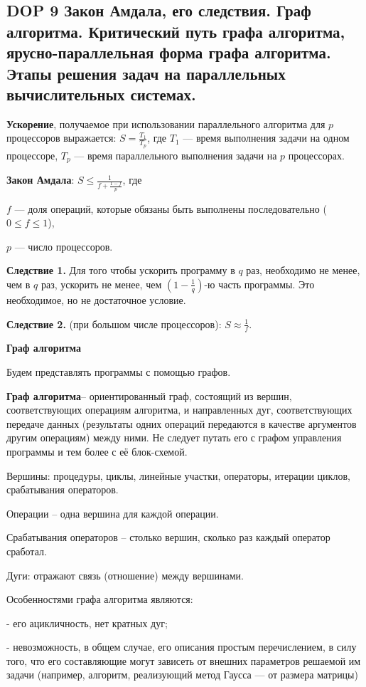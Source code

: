 \subsection{DOP 9 Закон Амдала, его следствия. Граф алгоритма. Критический путь графа алгоритма, ярусно-параллельная форма графа алгоритма. Этапы решения задач на параллельных вычислительных системах.}


\textbf{Ускорение}, получаемое при использовании параллельного алгоритма для $p$ процессоров выражается: $S = \frac{T_1}{T_p}$, где $T_1$ --- время выполнения задачи на одном процессоре, $T_p$ --- время параллельного выполнения задачи на $p$ процессорах.

\textbf{Закон Амдала}:
$S \leqslant \frac{1}{f + \frac{1 - f}{p}}$, где

$f$ --- доля операций, которые обязаны быть выполнены последовательно ($0 \leqslant f \leqslant 1$), 

$p$ --- число процессоров.

\textbf{Следствие 1.} 
Для того чтобы ускорить программу в $q$ раз, необходимо не менее, чем в $q$ раз, ускорить не менее, чем $\left(1 - \frac{1}{q}\right)$-ю часть программы. Это необходимое, но не достаточное условие.

\textbf{Следствие 2.} (при большом числе процессоров): 
$S \approx \frac{1}{f}$.

\textbf{Граф алгоритма}

Будем представлять программы с помощью графов.

\textbf{Граф алгоритма}-- ориентированный граф, состоящий из вершин, соответствующих операциям алгоритма, и направленных дуг, соответствующих передаче данных (результаты одних операций передаются в качестве аргументов другим операциям) между ними. Не следует путать его с графом управления программы и тем более с её блок-схемой.

Вершины: процедуры, циклы, линейные участки, операторы, итерации циклов, срабатывания операторов. 

Операции -- одна вершина для каждой операции. 

Срабатывания операторов -- столько вершин, сколько раз каждый оператор сработал.

Дуги: отражают связь (отношение) между вершинами.

Особенностями графа алгоритма являются:

 - его ацикличность, нет кратных дуг;
 
 - невозможность, в общем случае, его описания простым перечислением, в силу того, что его составляющие могут зависеть от внешних параметров решаемой им задачи (например, алгоритм, реализующий метод Гаусса — от размера матрицы)

